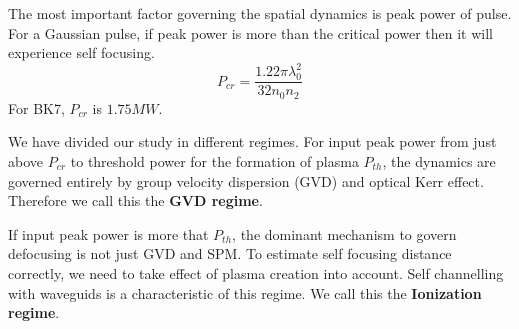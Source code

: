 \documentclass[../main.tex]{subfiles}
\begin{document}
	The most important factor governing the spatial dynamics is peak power
	of pulse. For a Gaussian pulse, if peak power is more than the critical
	power then it will experience self focusing.
	\begin{equation} \label{eq:Pcr_gu}
		P_{cr} = \frac{1.22 \pi \lambda_0^2}{32 n_0 n_2}
	\end{equation}
	For BK7, $P_{cr}$ is $1.75 MW$.

	We have divided our study in different regimes.
	For input peak power from just above $P_{cr}$ to threshold
	power for the formation of plasma $P_{th}$, the dynamics are governed
	entirely by group velocity dispersion (GVD) and optical Kerr effect.
	Therefore we call this the \textbf{GVD regime}.

	If input peak power is more that $P_{th}$, the dominant mechanism to
	govern defocusing is not just GVD and SPM. To estimate self focusing
	distance correctly, we need to take effect of plasma creation into
	account. Self channelling with waveguids is a characteristic of this
	regime. We call this the \textbf{Ionization regime}.
\end{document}

